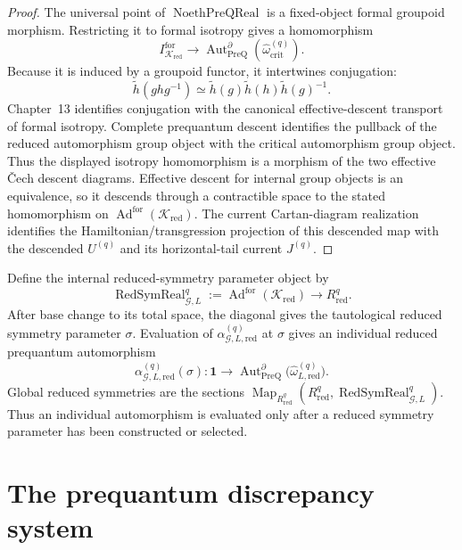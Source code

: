 \begin{proof}
The universal point of $\operatorname{NoethPreQReal}$ is a fixed-object formal
groupoid morphism.  Restricting it to formal isotropy gives a homomorphism
\[
I^{\mathrm{for}}_{\mathcal K_{\mathrm{red}}}
\longrightarrow
\operatorname{Aut}^{\partial}_{\mathrm{PreQ}}
(\widehat\omega_{\mathrm{crit}}^{(q)}).
\]
Because it is induced by a groupoid functor, it intertwines conjugation:
\[
\widetilde h(ghg^{-1})
\simeq
\widetilde h(g)\widetilde h(h)\widetilde h(g)^{-1}.
\]
Chapter~13 identifies conjugation with the canonical effective-descent transport
of formal isotropy.  Complete prequantum descent identifies the pullback of the
reduced automorphism group object with the critical automorphism group object.
Thus the displayed isotropy homomorphism is a morphism of the two effective
\v{C}ech descent diagrams.  Effective descent for internal group objects is an
equivalence, so it descends through a contractible space to the stated
homomorphism on $\operatorname{Ad}^{\mathrm{for}}(\mathcal K_{\mathrm{red}})$.
The current Cartan-diagram realization identifies the Hamiltonian/transgression
projection of this descended map with the descended $U^{(q)}$ and its
horizontal-tail current $J^{(q)}$.
\end{proof}

\begin{definition}
\label{def:prequantum-selected-reduced-symmetry-realization}
Define the internal reduced-symmetry parameter object by
\[
\boxed{
\operatorname{RedSymReal}_{\mathcal G,L}^{q}
:=
\operatorname{Ad}^{\mathrm{for}}(\mathcal K_{\mathrm{red}})
\longrightarrow R_{\mathrm{red}}^q.
}
\]
After base change to its total space, the diagonal gives the tautological reduced
symmetry parameter $\sigma$.  Evaluation of
$\alpha_{\mathcal G,L,\mathrm{red}}^{(q)}$ at $\sigma$ gives an individual
reduced prequantum automorphism
\[
\boxed{
\alpha_{\mathcal G,L,\mathrm{red}}^{(q)}(\sigma):
\mathbf1
\longrightarrow
\operatorname{Aut}^{\partial}_{\mathrm{PreQ}}
\bigl(\widehat\omega_{L,\mathrm{red}}^{(q)}\bigr).
}
\]
Global reduced symmetries are the sections
$\operatorname{Map}_{R_{\mathrm{red}}^q}
(R_{\mathrm{red}}^q,\operatorname{RedSymReal}_{\mathcal G,L}^{q})$.
Thus an individual automorphism is evaluated only after a reduced symmetry
parameter has been constructed or selected.
\end{definition}

\section{The prequantum discrepancy system}
\label{sec:prequantum-discrepancy-system}

